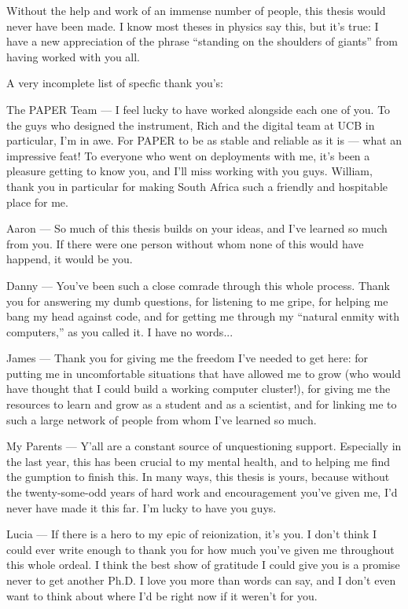 
\begin{acknowledgements}


  Without the help and work of an immense number of people, this thesis would never have been
  made. I know most theses in physics say this, but it's true: I have a new appreciation of 
  the phrase ``standing on the shoulders of giants'' from having worked with you all.

  A very incomplete list of specfic thank you's:

  The PAPER Team --- I feel lucky to have worked alongside each one of you. To the guys who
  designed the instrument, Rich and the digital team at UCB in particular, I'm in awe. For PAPER to be 
  as stable and reliable as it is --- what an impressive feat! To everyone who went on deployments
  with me, it's been a pleasure getting to know you, and I'll miss working with you guys. William, 
  thank you in particular for making South Africa such a friendly and hospitable place for me.  

  Aaron --- So much of this thesis builds on your ideas, and I've learned so much from you. If there
  were one person without whom none of this would have happend, it would be you.
    
  Danny --- You've been such a close comrade through this whole process. Thank you for answering my
  dumb questions, for listening to me gripe, for helping me bang my head against code, and for
  getting me through my ``natural enmity with computers,'' as you called it. I have no words...

  James --- Thank you for giving me the freedom I've needed to get here: for putting me in
  uncomfortable situations that have allowed me to grow (who would have thought that I could build a
  working computer cluster!), for giving me the resources to learn and grow as a student and as a
  scientist, and for linking me to such a large network of people from whom I've learned so much. 

  My Parents --- Y'all are a constant source of unquestioning support. Especially in the last year,
  this has been crucial to my mental health, and to helping me find the gumption to finish this. In
  many ways, this thesis is yours, because without the twenty-some-odd years of hard work and
  encouragement you've given me, I'd never have made it this far. I'm lucky to have you guys.

  Lucia --- If there is a hero to my epic of reionization, it's you. I don't think I could ever
  write enough to thank you for how much you've given me throughout this whole ordeal. I think the
  best show of gratitude I could give you is a promise never to get another Ph.D. I love you more
  than words can say, and I don't even want to think about where I'd be right now if it weren't 
  for you. 
  

\end{acknowledgements}
